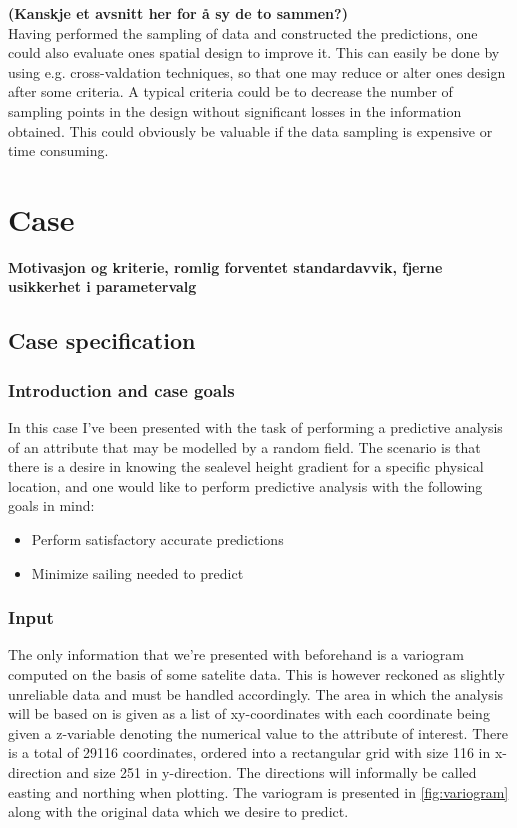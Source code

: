 \documentclass{report}
\begin{document}
\textbf{(Kanskje et avsnitt her for å sy de to sammen?)} \\

Having performed the sampling of data and constructed the predictions, one could also evaluate ones spatial design to improve it. This can easily be done by using e.g. cross-valdation techniques, so that one may reduce or alter ones design after some criteria. A typical criteria could be to decrease the number of sampling points in the design without significant losses in the information obtained. This could obviously be valuable if the data sampling is expensive or time consuming.  

\chapter{Case}
\textbf{Motivasjon og kriterie, romlig forventet standardavvik, fjerne usikkerhet i parametervalg} \\
\section{Case specification} 
\subsection{Introduction and case goals} \label{subs:goals}
In this case I've been presented with the task of performing a predictive analysis of an attribute that may be modelled by a random field. The scenario is that there is a desire in knowing the sealevel height gradient for a specific physical location, and one would like to perform predictive analysis with the following goals in mind:
\begin{itemize} 
\item Perform satisfactory accurate predictions
\item Minimize sailing needed to predict
\end{itemize} 

\subsection{Input}
The only information that we're presented with beforehand is a variogram computed on the basis of some satelite data. This is however reckoned as slightly unreliable data and must be handled accordingly. The area in which the analysis will be based on is given as a list of xy-coordinates with each coordinate being given a z-variable denoting the numerical value to the attribute of interest. There is a total of 29116 coordinates, ordered into a rectangular grid with size 116 in x-direction and size 251 in y-direction. The directions will informally be called easting and northing when plotting. The variogram is presented in \ref{fig:variogram} along with the original data which we desire to predict. \\
\end{document}
